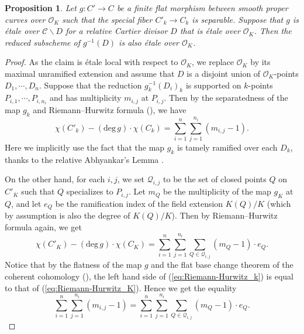 \documentclass[11pt, letterpaper]{amsart}
\theoremstyle{plain}
\newtheorem{proposition}[theorem]{Proposition}
\theoremstyle{definition}
\newcommand{\sC}{\mathcal{C}}
\renewcommand{\deg}{\mathrm{deg}}
\newcommand{\<}{\langle}
\renewcommand{\>}{\rangle}
\newcommand{\sO}{\mathcal{O}}
\begin{document}
\begin{proposition}
\label{prop:etaleness_of_pullback}
	Let $g : C' \to C$ be a finite flat morphism between smooth proper curves over $\sO_K$ such that the special fiber $C'_k \to C_k$ is separable. 
	Suppose that $g$ is \'etale over $\sC \smallsetminus D$ for a relative Cartier divisor $D$ that is \'etale over $\sO_K$. 
	Then the reduced subscheme of $g^{-1}(D)$ is also \'etale over $\sO_K$. 
\end{proposition}
\begin{proof}
	As the claim is \'etale local with respect to $\sO_K$, we replace $\sO_K$ by its maximal unramified extension and assume that $D$ is a disjoint union of $\sO_K$-points $D_1, \cdots, D_n$. 
	Suppose that the reduction $g_k^{-1}(D_i)_k$ is supported on $k$-points $P_{i, 1}, \cdots, P_{i, n_i}$ and has multiplicity $m_{i,j}$ at $P_{i, j}$.
	Then by the separatedness of the map $g_k$ and Riemann--Hurwitz formula (\cite[\href{https://stacks.math.columbia.edu/tag/0C1F}{Tag 0C1F}]{stacks-project}), we have 
	\begin{equation}
		\label{eq:Riemann-Hurwitz_k}
		\chi(C'_k) - (\deg \, g) \cdot \chi(C_k) = \sum_{i = 1}^n \sum_{j = 1}^{n_i} (m_{i, j} - 1). 
	\end{equation}
    Here we implicitly use the fact that the map $g_k$ is tamely ramified over each $D_k$, thanks to the relative Abhyankar's Lemma .
    
    On the other hand, for each $i, j$, we set $\mathcal{Q}_{i, j}$ to be the set of closed points $Q$ on $C'_K$ such that $Q$ specializes to $P_{i, j}$. 
    Let $m_Q$ be the multiplicity of the map $g_K$ at $Q$, and let $e_Q$ be the ramification index of the field extension $K(Q)/K$ (which by assumption is also the degree of $K(Q)/K$).
    Then by Riemann--Hurwitz formula again, we get
	\begin{equation}
		\label{eq:Riemann-Hurwitz_K}
		\chi(C'_K) - (\deg \, g) \cdot \chi(C_K) = \sum_{i = 1}^n \sum_{j = 1}^{n_i} \sum_{Q \in \mathcal{Q}_{i, j}}(m_Q - 1)\cdot e_Q. 
	\end{equation}
    Notice that by the flatness of the map $g$ and the flat base change theorem of the coherent cohomology (\cite[\href{https://stacks.math.columbia.edu/tag/02KH}{Tag 02KH}]{stacks-project}), the left hand side of (\ref{eq:Riemann-Hurwitz_k}) is equal to that of (\ref{eq:Riemann-Hurwitz_K}).
    Hence we get the equality
    \begin{equation}
    	\label{eq:ram_deg_k_and_K}
    	\sum_{i = 1}^n \sum_{j = 1}^{n_i} (m_{i, j} - 1) = \sum_{i = 1}^n \sum_{j = 1}^{n_i} \sum_{Q \in \mathcal{Q}_{i, j}}(m_Q - 1)\cdot e_Q. 
    \end{equation}



\end{proof}
\end{document}

